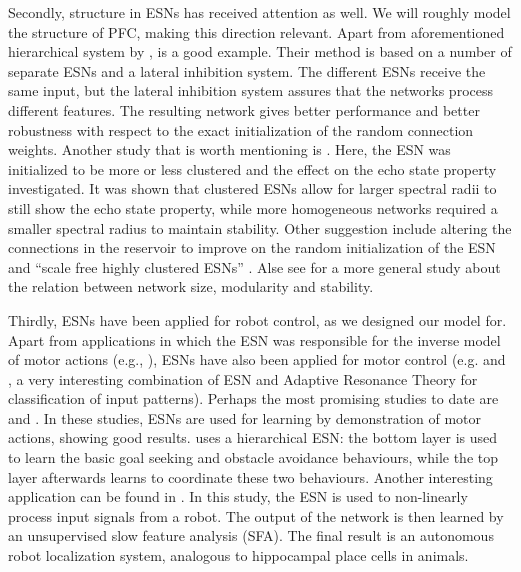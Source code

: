 \documentclass[10pt,a4paper]{report}
\begin{document}
Secondly, structure in ESNs has received attention as well. We will roughly model the structure of PFC, making this direction relevant. Apart from aforementioned hierarchical system by \citet{Jaeger2007}, \citet{Xue2007} is a good example. Their method is based on a number of separate ESNs and a lateral inhibition system. The different ESNs receive the same input, but the lateral inhibition system assures that the networks process different features. The resulting network gives better performance and better robustness with respect to the exact initialization of the random connection weights. Another study that is worth mentioning is \citet{Jarvis2010}. Here, the ESN was initialized to be more or less clustered and the effect on the echo state property investigated. It was shown that clustered ESNs allow for larger spectral radii to still show the echo state property, while more homogeneous networks required a smaller spectral radius to maintain stability. Other suggestion include altering the connections in the reservoir to improve on the random initialization of the ESN \citep{Sussillo2009,Dutoit2009} and ``scale free highly clustered ESNs'' \citep{Deng2007}. Alse see \citet{Kaiser2010} for a more general study about the relation between network size, modularity and stability.

Thirdly, ESNs have been applied for robot control, as we designed our model for. Apart from applications in which the ESN was responsible for the inverse model of motor actions (e.g., \citet{Ploger2004}), ESNs have also been applied for motor control (e.g. \citet{Salmen2005} and \citet{Morse2009a}, a very interesting combination of ESN and Adaptive Resonance Theory for classification of input patterns). Perhaps the most promising studies to date are \citet{Hartland2007} and \citet{Waegeman2009}. In these studies, ESNs are used for learning by demonstration of motor actions, showing good results. \citet{Waegeman2009} uses a hierarchical ESN: the bottom layer is used to learn the basic goal seeking and obstacle avoidance behaviours, while the top layer afterwards learns to coordinate these two behaviours. Another interesting application can be found in \citet{Antonelo2011}. In this study, the ESN is used to non-linearly process input signals from a robot. The output of the network is then learned by an unsupervised slow feature analysis (SFA). The final result is an autonomous robot localization system, analogous to hippocampal place cells in animals.
\end{document}
